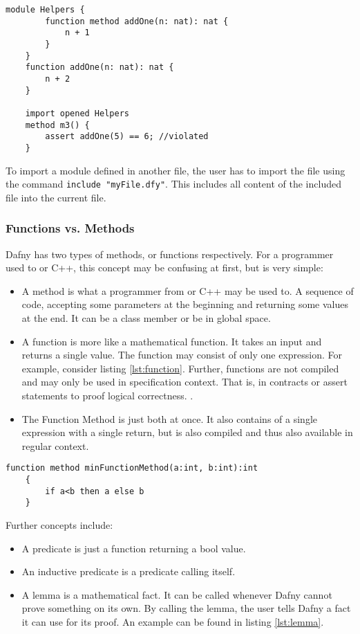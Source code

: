 \begin{lstlisting}[caption={Naming Clash}, captionpos=b, label={lst:moduleShadowing}]
    module Helpers {
        function method addOne(n: nat): nat {
            n + 1
        }
    }
    function addOne(n: nat): nat {
        n + 2
    }

    import opened Helpers  
    method m3() {
        assert addOne(5) == 6; //violated
    }

\end{lstlisting}

To import a module defined in another file, the user has to import the file using the command \texttt{include "myFile.dfy"}. This includes all content of the included file into the current file.

\subsubsection{Functions vs. Methods}
Dafny has two types of methods, or functions respectively. For a programmer used to \Csharp or C++, this concept may be confusing at first, but is very simple:
\begin{itemize}
\item A method is what a programmer from \Csharp or C++ may be used to. A sequence of code, accepting some parameters at the beginning and returning some values at the end. It can be a class member or be in global space.
\item A function is more like a mathematical function. It takes an input and returns a single value. The function may consist of only one expression. For example, consider listing \ref{lst:function}. Further, functions are not compiled and may only be used in specification context. That is, in contracts or assert statements to proof logical correctness. \cite{functionVSMethod}.
\item The Function Method is just both at once. It also contains of a single expression with a single return, but is also compiled and thus also available in regular context. \cite{functionVSMethod} 
\end{itemize}

\begin{lstlisting}[caption={Function}, captionpos=b, label={lst:function}]
    function method minFunctionMethod(a:int, b:int):int
    {
        if a<b then a else b
    }
\end{lstlisting}

Further concepts include:
\begin{itemize}
\item A predicate is just a function returning a bool value.
\item An inductive predicate is a predicate calling itself.
\item A lemma is a mathematical fact. It can be called whenever Dafny cannot prove something on its own. By calling the lemma, the user tells Dafny a fact it can use for its proof. An example can be found in listing \ref{lst:lemma}. \cite{dafnyReferenceManual}
\end{itemize}

